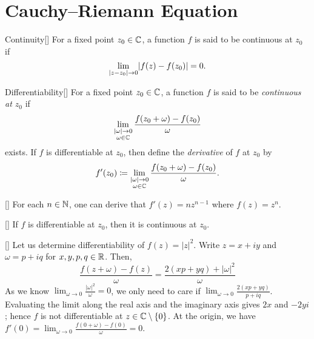 \documentclass[../complex_variables_1.tex]{subfiles}
\begin{document}
\section{Cauchy--Riemann Equation}

\begin{Definition}{Continuity}[]
    For a fixed point \(z_0 \in \CC\), a function
    \(f\) is said to be continuous at \(z_0\) if
    \[
        \lim_{\lvert z-z_0\rvert \to 0} \lvert f(z)-f(z_0)\rvert = 0\text.
    \]
\end{Definition}

\begin{Definition}{Differentiability}[]
    For a fixed point \(z_0 \in \CC\), a function
    \(f\) is said to be \emph{continuous at \(z_0\)} if
    \[
        \lim_{\substack{|\omega| \to 0 \\ \omega \in \CC}} \frac{f(z_0+\omega) - f(z_0)}{\omega}
    \]
    exists. If \(f\) is differentiable at \(z_0\), then define the \emph{derivative} of \(f\) at
    \(z_0\) by
    \[
        f'(z_0) \coloneqq \lim_{\substack{|\omega| \to 0 \\ \omega \in \CC}} \frac{f(z_0+\omega) -
        f(z_0)}{\omega}\text.
    \]
\end{Definition}

\begin{Example}{}[]
    For each \(n \in \NN\), one can derive that \(f'(z) = nz^{n-1}\) where \(f(z) = z^n\).
\end{Example}

\begin{Theorem}{}[]
    If \(f\) is differentiable at \(z_0\), then it is continuous at \(z_0\).
\end{Theorem}

\begin{Example}{}[]
    Let us determine differentiability of \(f(z) = |z|^2\).
    Write \(z = x+iy\) and \(\omega = p+iq\) for \(x,y,p,q\in\RR\).
    Then,
    \[
        \frac{f(z+\omega)-f(z)}{\omega} = \frac{2(xp+yq)+|\omega|^2}{\omega}
    \]
    As we know \(\lim_{\omega \to 0} \frac{|\omega|^2}{\omega} = 0\), we only need to care if
    \(\lim_{\omega \to 0} \frac{2(xp+yq)}{p+iq}\).
    Evaluating the limit along the real axis and the imaginary axis gives \(2x\) and \(-2yi\);
    hence \(f\) is not differentiable at \(z \in \CC \setminus \{0\}\).
    At the origin, we have \(f'(0) = \lim_{\omega \to 0} \frac{f(0+\omega)-f(0)}{\omega} = 0\).
\end{Example}
\end{document}
